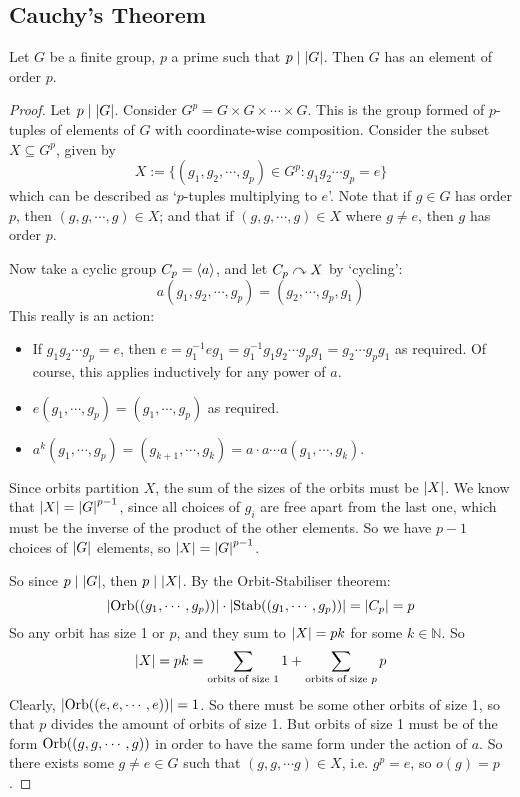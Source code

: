 \subsection{Cauchy's Theorem}
\begin{theorem}
	Let \(G\) be a finite group, \(p\) a prime such that \(p \mid \abs{G}\). Then \(G\) has an element of order \(p\).
\end{theorem}
\begin{proof}
	Let \(p \mid \abs{G}\). Consider \(G^p = G \times G \times \cdots \times G\). This is the group formed of \(p\)-tuples of elements of \(G\) with coordinate-wise composition. Consider the subset \(X \subseteq G^p\), given by
	\[ X := \{ (g_1, g_2, \cdots, g_p) \in G^p: g_1g_2\cdots g_p = e \} \]
	which can be described as `\(p\)-tuples multiplying to \(e\)'. Note that if \(g \in G\) has order \(p\), then \((g, g, \cdots, g) \in X\); and that if \((g, g, \cdots, g) \in X\) where \(g \neq e\), then \(g\) has order \(p\).

	Now take a cyclic group \(C_p = \langle a \rangle\), and let \(C_p \curvearrowright X\) by `cycling':
	\[ a(g_1, g_2, \cdots, g_p) = (g_2, \cdots, g_p, g_1) \]
	This really is an action:
	\begin{itemize}
		\item If \(g_1g_2 \cdots g_p = e\), then \(e = g_1^{-1} e g_1 = g_1^{-1}g_1g_2 \cdots g_p g_1 = g_2 \cdots g_pg_1\) as required. Of course, this applies inductively for any power of \(a\).
		\item \(e(g_1, \cdots, g_p) = (g_1, \cdots, g_p)\) as required.
		\item \(a^k(g_1, \cdots, g_p) = (g_{k+1}, \cdots, g_k) = a \cdot a \cdots a(g_1, \cdots, g_k)\).
	\end{itemize}
	Since orbits partition \(X\), the sum of the sizes of the orbits must be \(\abs{X}\). We know that \(\abs{X} = \abs{G}^{p-1}\), since all choices of \(g_i\) are free apart from the last one, which must be the inverse of the product of the other elements. So we have \(p-1\) choices of \(\abs{G}\) elements, so \(\abs{X} = \abs{G}^{p-1}\).

	So since \(p \mid \abs{G}\), then \(p \mid \abs{X}\). By the Orbit-Stabiliser theorem:
	\[ \abs{\operatorname{Orb}((g_1, \cdots, g_p))} \cdot \abs{\operatorname{Stab}((g_1, \cdots, g_p))} = \abs{C_p} = p \]
	So any orbit has size 1 or \(p\), and they sum to \(\abs{X} = pk\) for some \(k \in \mathbb N\). So
	\[ \abs{X} = pk = \sum_{\text{orbits of size 1}} 1 + \sum_{\text{orbits of size \(p\)}} p \]
	Clearly, \(\abs{\operatorname{Orb}((e, e, \cdots, e))} = 1\). So there must be some other orbits of size 1, so that \(p\) divides the amount of orbits of size 1. But orbits of size 1 must be of the form \(\operatorname{Orb}((g, g, \cdots, g))\) in order to have the same form under the action of \(a\). So there exists some \(g \neq e \in G\) such that \((g, g, \cdots g) \in X\), i.e. \(g^p = e\), so \(o(g) = p\).
\end{proof}
